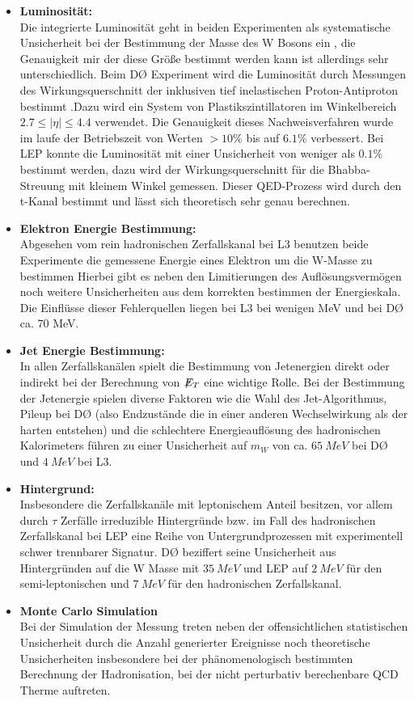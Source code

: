 \documentclass[a4paper,12pt]{article}
\newcommand{\met}{\ensuremath{\not\mathrel{E}}_T}
\begin{document}
\begin{itemize}
	\item \textbf{Luminosität:} \\
	Die integrierte Luminosität geht in beiden Experimenten als systematische Unsicherheit bei der Bestimmung der Masse des W Bosons ein
	, die Genauigkeit mir der diese Größe bestimmt werden kann ist allerdings sehr unterschiedlich. Beim DØ Experiment wird die Luminosität
	durch Messungen des Wirkungsquerschnitt der inklusiven tief inelastischen Proton-Antiproton bestimmt \cite{2011arXiv1106.5182P}.Dazu
	wird ein System von Plastikszintillatoren im Winkelbereich $2.7 \leq |\eta| \leq 4.4$ verwendet. Die Genauigkeit dieses Nachweisverfahren wurde
	im laufe der Betriebszeit von Werten $ > 10\%$ bis auf $ 6.1\%$ verbessert. Bei LEP konnte die Luminosität mit einer Unsicherheit von weniger
	als $0.1\%$ bestimmt werden, dazu wird der Wirkungsquerschnitt für die Bhabba-Streuung mit kleinem Winkel gemessen. Dieser QED-Prozess
	wird durch den t-Kanal bestimmt und lässt sich theoretisch sehr genau berechnen.
	\item \textbf{Elektron Energie Bestimmung:} \\
	Abgesehen vom rein hadronischen Zerfallskanal bei L3 benutzen beide Experimente die gemessene Energie eines Elektron um die W-Masse zu bestimmen
	Hierbei gibt es neben den Limitierungen des Auflösungsvermögen noch weitere Unsicherheiten aus dem korrekten bestimmen der Energieskala.
	Die Einflüsse dieser Fehlerquellen liegen bei L3 bei wenigen MeV und bei DØ ca. 70 MeV.
	\item \textbf{Jet Energie Bestimmung:} \\
	In allen Zerfallskanälen spielt die Bestimmung von Jetenergien direkt oder indirekt bei der Berechnung von $\met$ eine wichtige Rolle. Bei der
	Bestimmung der Jetenergie spielen diverse Faktoren wie die Wahl des Jet-Algorithmus, Pileup bei DØ (also Endzustände die in einer anderen Wechselwirkung
	als der harten entstehen) und die schlechtere Energieauflösung des hadronischen Kalorimeters führen zu einer Unsicherheit auf $m_{W}$ von
	ca. $\SI{65}{MeV}$ bei DØ und $\SI{4}{MeV}$ bei L3.
	\item \textbf{Hintergrund:}\\
	Insbesondere die Zerfallskanäle mit leptonischem Anteil besitzen, vor allem durch $\tau$ Zerfälle irreduzible Hintergründe bzw. im Fall
	des hadronischen Zerfallskanal bei LEP eine Reihe von Untergrundprozessen mit experimentell schwer trennbarer Signatur. DØ beziffert seine
	Unsicherheit aus Hintergründen auf die W Masse mit $\SI{35}{MeV}$ und LEP auf $\SI{2}{MeV}$ für den semi-leptonischen und $\SI{7}{MeV}$
	für den hadronischen Zerfallskanal.
	\item \textbf{Monte Carlo Simulation}\\
	Bei der Simulation der Messung treten neben der offensichtlichen statistischen Unsicherheit durch die Anzahl generierter Ereignisse noch
	theoretische Unsicherheiten insbesondere bei der phänomenologisch bestimmten Berechnung der Hadronisation, bei der nicht perturbativ berechenbare
	QCD Therme auftreten.
\end{itemize}
\end{document}
